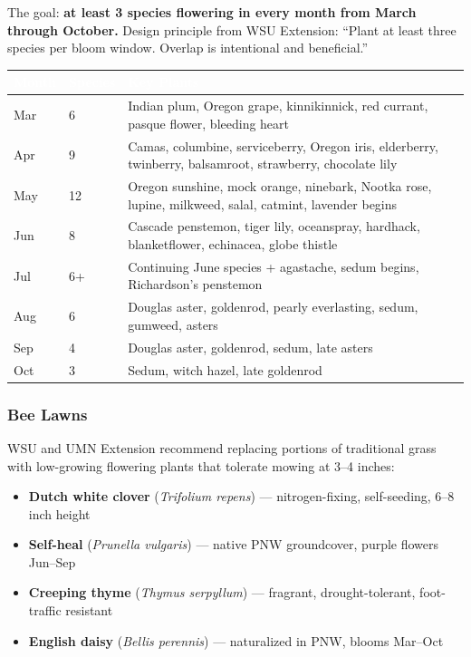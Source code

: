 \documentclass[11pt,letterpaper]{article}
\newcommand{\tableheader}[1]{\textbf{\sffamily\textcolor{white}{#1}}}
\begin{document}
The goal: \textbf{at least 3 species flowering in every month from March through October.} Design principle from WSU Extension: ``Plant at least three species per bloom window. Overlap is intentional and beneficial.''

\begin{center}
\begin{tabularx}{\textwidth}{C{1.5cm}C{1.5cm}X}
\toprule
{}
\tableheader{Month} & \tableheader{Species} & \tableheader{Key Plants} \\
\midrule
Mar & 6 & Indian plum, Oregon grape, kinnikinnick, red currant, pasque flower, bleeding heart \\
Apr & 9 & Camas, columbine, serviceberry, Oregon iris, elderberry, twinberry, balsamroot, strawberry, chocolate lily \\
May & 12 & Oregon sunshine, mock orange, ninebark, Nootka rose, lupine, milkweed, salal, catmint, lavender begins \\
Jun & 8 & Cascade penstemon, tiger lily, oceanspray, hardhack, blanketflower, echinacea, globe thistle \\
Jul & 6+ & Continuing June species + agastache, sedum begins, Richardson's penstemon \\
Aug & 6 & Douglas aster, goldenrod, pearly everlasting, sedum, gumweed, asters \\
Sep & 4 & Douglas aster, goldenrod, sedum, late asters \\
Oct & 3 & Sedum, witch hazel, late goldenrod \\
\bottomrule
\end{tabularx}
\end{center}

\subsubsection{Bee Lawns}

WSU and UMN Extension recommend replacing portions of traditional grass with low-growing flowering plants that tolerate mowing at 3--4 inches:

\begin{itemize}[nosep]
  \item \textbf{Dutch white clover} (\textit{Trifolium repens}) --- nitrogen-fixing, self-seeding, 6--8 inch height
  \item \textbf{Self-heal} (\textit{Prunella vulgaris}) --- native PNW groundcover, purple flowers Jun--Sep
  \item \textbf{Creeping thyme} (\textit{Thymus serpyllum}) --- fragrant, drought-tolerant, foot-traffic resistant
  \item \textbf{English daisy} (\textit{Bellis perennis}) --- naturalized in PNW, blooms Mar--Oct
\end{itemize}
\end{document}

